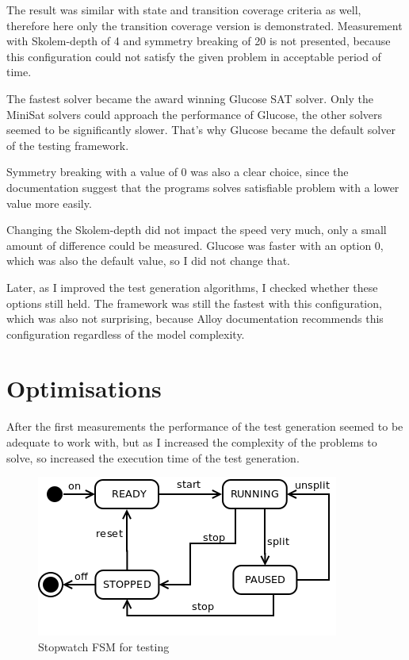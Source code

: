 The result was similar with state and transition coverage criteria as well, therefore here only the transition coverage version is demonstrated. Measurement with Skolem-depth of 4 and symmetry breaking of 20 is not presented, because this configuration could not satisfy the given problem in acceptable period of time.

The fastest solver became the award winning Glucose SAT solver. Only the MiniSat solvers could approach the performance of Glucose, the other solvers seemed to be significantly slower. That's why Glucose became the default solver of the testing framework.

Symmetry breaking with a value of 0 was also a clear choice, since the documentation suggest that the programs solves satisfiable problem with a lower value more easily. 

Changing the Skolem-depth did not impact the speed very much, only a small amount of difference could be measured. Glucose was faster with an option 0, which was also the default value, so I did not change that.

Later, as I improved the test generation algorithms, I checked whether these options still held. The framework was still the fastest with this configuration, which was also not surprising, because Alloy documentation recommends this configuration regardless of the model complexity.


\section{Optimisations}
\label{sec:optimalisations}

After the first measurements the performance of the test generation seemed to be adequate to work with, but as I increased the complexity of the problems to solve, so increased the execution time of the test generation. 

\begin{figure}[htp]
\centering
\includegraphics[scale=0.5]{figures/measurements_stopwatch}
\caption{Stopwatch FSM for testing}
\label{fig:measurements_stopwatch}
\end{figure}

